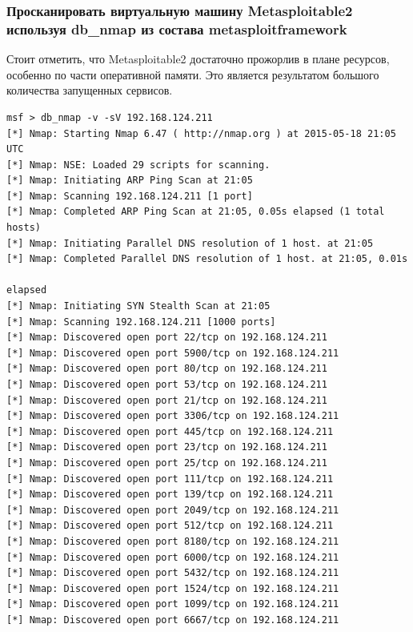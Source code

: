 \newpage
\subsubsection{Просканировать виртуальную машину Metasploitable2 используя db\_nmap из состава metasploit\-framework}




Стоит отметить, что Metasploitable2 достаточно прожорлив в плане ресурсов, особенно по части оперативной памяти. Это является результатом большого количества запущенных сервисов.

\begin{Verbatim}[frame=single]
msf > db_nmap -v -sV 192.168.124.211
[*] Nmap: Starting Nmap 6.47 ( http://nmap.org ) at 2015-05-18 21:05 UTC
[*] Nmap: NSE: Loaded 29 scripts for scanning.
[*] Nmap: Initiating ARP Ping Scan at 21:05
[*] Nmap: Scanning 192.168.124.211 [1 port]
[*] Nmap: Completed ARP Ping Scan at 21:05, 0.05s elapsed (1 total hosts)
[*] Nmap: Initiating Parallel DNS resolution of 1 host. at 21:05
[*] Nmap: Completed Parallel DNS resolution of 1 host. at 21:05, 0.01s
                                                                      elapsed
[*] Nmap: Initiating SYN Stealth Scan at 21:05
[*] Nmap: Scanning 192.168.124.211 [1000 ports]
[*] Nmap: Discovered open port 22/tcp on 192.168.124.211
[*] Nmap: Discovered open port 5900/tcp on 192.168.124.211
[*] Nmap: Discovered open port 80/tcp on 192.168.124.211
[*] Nmap: Discovered open port 53/tcp on 192.168.124.211
[*] Nmap: Discovered open port 21/tcp on 192.168.124.211
[*] Nmap: Discovered open port 3306/tcp on 192.168.124.211
[*] Nmap: Discovered open port 445/tcp on 192.168.124.211
[*] Nmap: Discovered open port 23/tcp on 192.168.124.211
[*] Nmap: Discovered open port 25/tcp on 192.168.124.211
[*] Nmap: Discovered open port 111/tcp on 192.168.124.211
[*] Nmap: Discovered open port 139/tcp on 192.168.124.211
[*] Nmap: Discovered open port 2049/tcp on 192.168.124.211
[*] Nmap: Discovered open port 512/tcp on 192.168.124.211
[*] Nmap: Discovered open port 8180/tcp on 192.168.124.211
[*] Nmap: Discovered open port 6000/tcp on 192.168.124.211
[*] Nmap: Discovered open port 5432/tcp on 192.168.124.211
[*] Nmap: Discovered open port 1524/tcp on 192.168.124.211
[*] Nmap: Discovered open port 1099/tcp on 192.168.124.211
[*] Nmap: Discovered open port 6667/tcp on 192.168.124.211

\end{Verbatim}
